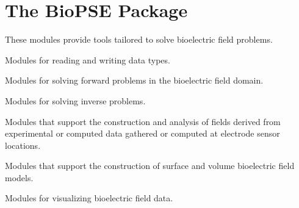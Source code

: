 \section{The BioPSE Package}
\label{sec:biopsepackage}


These modules provide  tools tailored to solve bioelectric field
problems.

\begin{description}
   Modules for reading and writing \sr{}
  data types.
  
   Modules for solving forward
  problems in the bioelectric field domain.
  
   Modules for solving inverse
  problems.
  
   Modules that support
  the construction and analysis of fields derived from experimental or
  computed data gathered or computed at electrode sensor locations.
  
   Modules that support the
  construction of surface and volume bioelectric field models.
  
   Modules for visualizing
  bioelectric field data.
\end{description}


